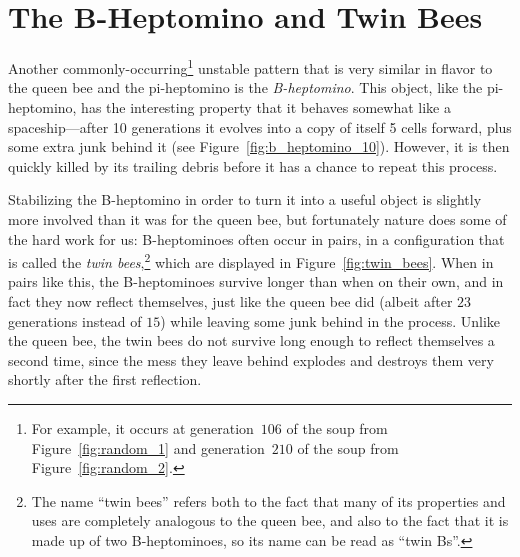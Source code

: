 \section{The B-Heptomino and Twin Bees}\label{sec:twin_bees}

Another commonly-occurring\footnote{For example, it occurs at generation~$106$ of the soup from Figure~\ref{fig:random_1} and generation~$210$ of the soup from Figure~\ref{fig:random_2}.} unstable pattern that is very similar in flavor to the queen bee and the pi-heptomino is the \emph{B-heptomino}. This object, like the pi-heptomino, has the interesting property that it behaves somewhat like a spaceship---after 10 generations it evolves into a copy of itself 5 cells forward, plus some extra junk behind it (see Figure~\ref{fig:b_heptomino_10}). However, it is then quickly killed by its trailing debris before it has a chance to repeat this process.

Stabilizing the B-heptomino in order to turn it into a useful object is slightly more involved than it was for the queen bee, but fortunately nature does some of the hard work for us: B-heptominoes often occur in pairs, in a configuration that is called the \emph{twin bees},\footnote{The name ``twin bees'' refers both to the fact that many of its properties and uses are completely analogous to the queen bee, and also to the fact that it is made up of two B-heptominoes, so its name can be read as ``twin Bs''.} which are displayed in Figure~\ref{fig:twin_bees}. When in pairs like this, the B-heptominoes survive longer than when on their own, and in fact they now reflect themselves, just like the queen bee did (albeit after $23$ generations instead of $15$) while leaving some junk behind in the process. Unlike the queen bee, the twin bees do not survive long enough to reflect themselves a second time, since the mess they leave behind explodes and destroys them very shortly after the first reflection.

